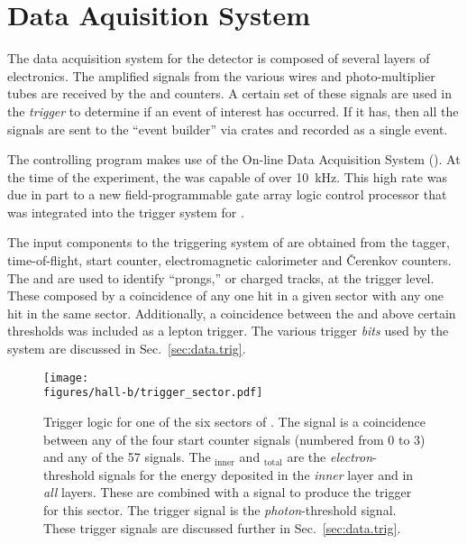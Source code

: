 \section{Data Aquisition System}\label{sec:clas.daq}

The data acquisition system for the  detector is composed of several layers of electronics. The amplified signals from the various wires and photo-multiplier tubes are received by the  and  counters. A certain set of these signals are used in the \emph{trigger} to determine if an event of interest has occurred. If it has, then all the signals are sent to the ``event builder'' via \label{abbr:camac}\cite{clas} crates and recorded as a single event.

The controlling program makes use of the  On-line Data Acquisition System (\label{abbr:coda})\cite{clas}. At the time of the  experiment, the  was capable of over 10~kHz. This high rate was due in part to a new field-programmable gate array \label{abbr:fpga} logic control processor that was integrated into the trigger system for \cite{clas.trig}.

The input components to the triggering system of  are obtained from the tagger, time-of-flight, start counter, electromagnetic calorimeter and \v{C}erenkov counters. The  and  are used to identify ``prongs,'' or charged tracks, at the trigger level. These composed by a coincidence of any one  hit in a given sector with any one  hit in the same sector. Additionally, a coincidence between the  and  above certain thresholds was included as a lepton trigger. The various trigger \emph{bits} used by the system are discussed in Sec.~\ref{sec:data.trig}.

\begin{figure}\begin{center}
\texttt{[image: \\figures/hall-b/trigger\_sector.pdf]}
\caption[Trigger Logic - One Sector]{\label{fig:clas.daq.trigsec}{}Trigger logic for one of the six sectors of . The  signal is a coincidence between any of the four start counter  signals (numbered from 0 to 3) and any of the 57   signals. The $_\mathrm{inner}$ and $_{\mathrm{total}}$ are the \emph{electron}-threshold  signals for the energy deposited in the \emph{inner} layer and in \emph{all} layers. These are combined with a  signal to produce the  trigger for this sector. The  trigger signal is the \emph{photon}-threshold  signal. These trigger signals are discussed further in Sec.~\ref{sec:data.trig}.}
\end{center}\end{figure}
